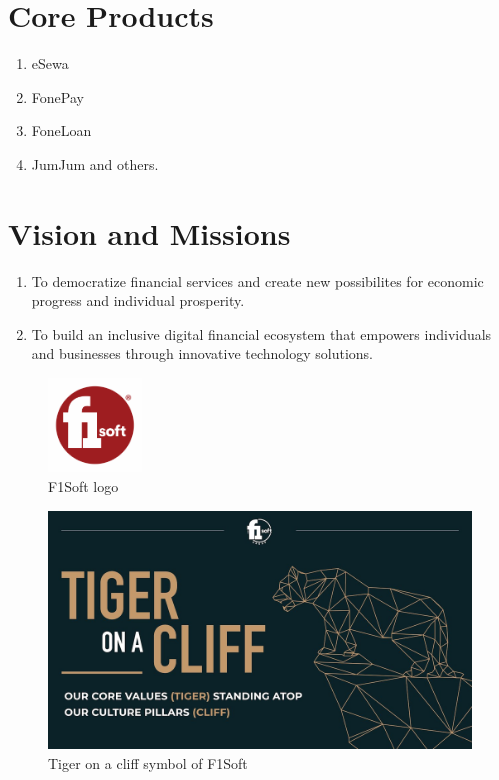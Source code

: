 \documentclass[12pt, a4paper]{report}
\begin{document}
\section{Core Products}
\begin{enumerate}
    \item eSewa
    \item FonePay
    \item FoneLoan
    \item JumJum and others.
\end{enumerate}
\vspace{18pt}
\section{Vision and Missions}
\begin{enumerate}
    \item To democratize financial services and create new possibilites for economic progress and individual prosperity.
    \item To build an inclusive digital financial ecosystem that empowers individuals and businesses through innovative technology solutions.
\end{enumerate}
\begin{figure}[h]
\centering
\includegraphics[width=25mm, height = 25mm]{images/f1softlogo.png}
\caption{F1Soft logo}
\end{figure}
\begin{figure}[h]
\centering
\includegraphics[scale=0.2]{images/tiger.jpg}
\caption{Tiger on a cliff symbol of F1Soft}
\end{figure}
\end{document}
